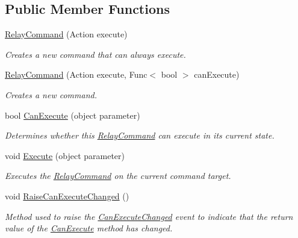 \subsection*{Public Member Functions}
\begin{DoxyCompactItemize}
\item 
\hyperlink{class__1aarsproeve_1_1_common_1_1_relay_command_ab592bbed4e6cfd1559dcaffe23223a13}{Relay\+Command} (Action execute)
\begin{DoxyCompactList}\small\item\em Creates a new command that can always execute. \end{DoxyCompactList}\item 
\hyperlink{class__1aarsproeve_1_1_common_1_1_relay_command_a29a92428317c491efba524c871cce065}{Relay\+Command} (Action execute, Func$<$ bool $>$ can\+Execute)
\begin{DoxyCompactList}\small\item\em Creates a new command. \end{DoxyCompactList}\item 
bool \hyperlink{class__1aarsproeve_1_1_common_1_1_relay_command_a3c52d00e1d9ab7ab06cc4244b50fbee2}{Can\+Execute} (object parameter)
\begin{DoxyCompactList}\small\item\em Determines whether this \hyperlink{class__1aarsproeve_1_1_common_1_1_relay_command}{Relay\+Command} can execute in its current state. \end{DoxyCompactList}\item 
void \hyperlink{class__1aarsproeve_1_1_common_1_1_relay_command_a0958a03842d5de3567d9e644026046b3}{Execute} (object parameter)
\begin{DoxyCompactList}\small\item\em Executes the \hyperlink{class__1aarsproeve_1_1_common_1_1_relay_command}{Relay\+Command} on the current command target. \end{DoxyCompactList}\item 
void \hyperlink{class__1aarsproeve_1_1_common_1_1_relay_command_a90744bca5c47a6c212fd7d0cb89182f1}{Raise\+Can\+Execute\+Changed} ()
\begin{DoxyCompactList}\small\item\em Method used to raise the \hyperlink{class__1aarsproeve_1_1_common_1_1_relay_command_a4502fa3e74d23cc9cd33cec559e96390}{Can\+Execute\+Changed} event to indicate that the return value of the \hyperlink{class__1aarsproeve_1_1_common_1_1_relay_command_a3c52d00e1d9ab7ab06cc4244b50fbee2}{Can\+Execute} method has changed. \end{DoxyCompactList}\end{DoxyCompactItemize}
